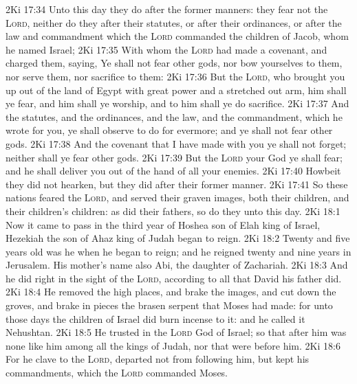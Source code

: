 \vs 2Ki 17:34 Unto this day they do after the former manners: they fear not the \textsc{Lord}, neither do they after their statutes, or after their ordinances, or after the law and commandment which the \textsc{Lord} commanded the children of Jacob, whom he named Israel;
\vs 2Ki 17:35 With whom the \textsc{Lord} had made a covenant, and charged them, saying, Ye shall not fear other gods, nor bow yourselves to them, nor serve them, nor sacrifice to them:
\vs 2Ki 17:36 But the \textsc{Lord}, who brought you up out of the land of Egypt with great power and a stretched out arm, him shall ye fear, and him shall ye worship, and to him shall ye do sacrifice.
\vs 2Ki 17:37 And the statutes, and the ordinances, and the law, and the commandment, which he wrote for you, ye shall observe to do for evermore; and ye shall not fear other gods.
\vs 2Ki 17:38 And the covenant that I have made with you ye shall not forget; neither shall ye fear other gods.
\vs 2Ki 17:39 But the \textsc{Lord} your God ye shall fear; and he shall deliver you out of the hand of all your enemies.
\vs 2Ki 17:40 Howbeit they did not hearken, but they did after their former manner.
\vs 2Ki 17:41 So these nations feared the \textsc{Lord}, and served their graven images, both their children, and their children's children: as did their fathers, so do they unto this day.
\vs 2Ki 18:1 Now it came to pass in the third year of Hoshea son of Elah king of Israel,  Hezekiah the son of Ahaz king of Judah began to reign.
\vs 2Ki 18:2 Twenty and five years old was he when he began to reign; and he reigned twenty and nine years in Jerusalem. His mother's name also  Abi, the daughter of Zachariah.
\vs 2Ki 18:3 And he did  right in the sight of the \textsc{Lord}, according to all that David his father did.
\vs 2Ki 18:4 He removed the high places, and brake the images, and cut down the groves, and brake in pieces the brasen serpent that Moses had made: for unto those days the children of Israel did burn incense to it: and he called it Nehushtan.
\vs 2Ki 18:5 He trusted in the \textsc{Lord} God of Israel; so that after him was none like him among all the kings of Judah, nor  that were before him.
\vs 2Ki 18:6 For he clave to the \textsc{Lord},  departed not from following him, but kept his commandments, which the \textsc{Lord} commanded Moses.
